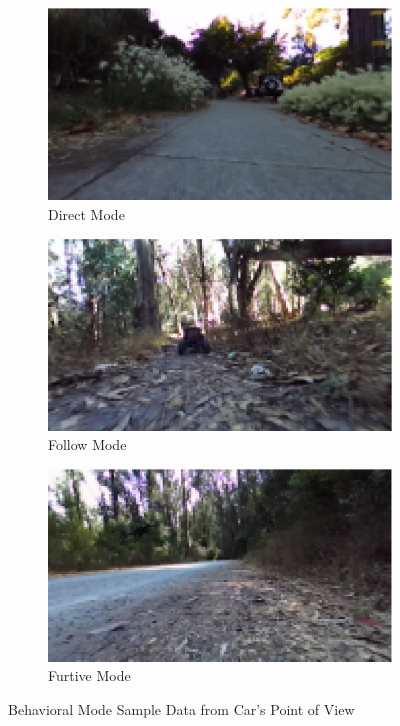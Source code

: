 {\begin{figure}[!th]
    \centering
    \begin{subfigure}{0.3\textwidth}
       \centering
       \includegraphics[width=\linewidth]{paper/content/images/directexample}
       \caption{Direct Mode}
       \label{fig1:direct}
    \end{subfigure}
    \begin{subfigure}{0.3\textwidth}
       \centering
       \includegraphics[width=\linewidth]{paper/content/images/followexample}
       \caption{Follow Mode}
       \label{fig1:follow}
    \end{subfigure}
    \begin{subfigure}{0.3\textwidth}
       \centering
       \includegraphics[width=\linewidth]{paper/content/images/furtiveexample}
       \caption{Furtive Mode}
       \label{fig1:furtive}
    \end{subfigure}
    \caption{Behavioral Mode Sample Data from Car's Point of View}
    \label{fig1:behavioralmodes}
\end{figure}
}

